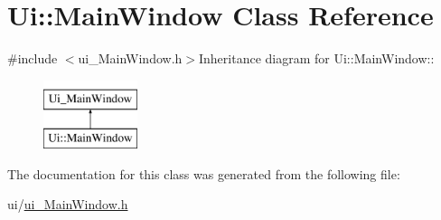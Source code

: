 \hypertarget{classUi_1_1MainWindow}{
\section{Ui::MainWindow Class Reference}
\label{classUi_1_1MainWindow}
}


{\ttfamily \#include $<$ui\_\-MainWindow.h$>$}Inheritance diagram for Ui::MainWindow::\begin{figure}[H]
\begin{center}
\leavevmode
\includegraphics[height=2cm]{classUi_1_1MainWindow}
\end{center}
\end{figure}


The documentation for this class was generated from the following file:\begin{DoxyCompactItemize}
\item 
ui/\hyperlink{ui__MainWindow_8h}{ui\_\-MainWindow.h}\end{DoxyCompactItemize}
